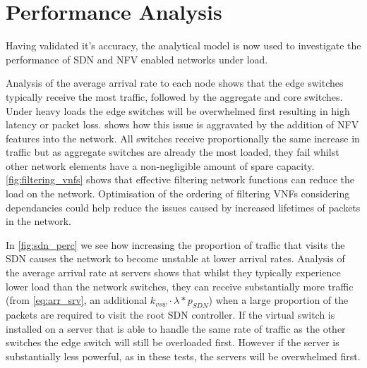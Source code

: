 \section{Performance Analysis}
Having validated it's accuracy, the analytical model is now used to investigate the performance of SDN and NFV enabled networks under load.

Analysis of the average arrival rate to each node shows that the edge switches typically receive the most traffic, followed by the aggregate and core switches. Under heavy loads the edge switches will be overwhelmed first resulting in high latency or packet loss.  shows how this issue is aggravated by the addition of NFV features into the network. All switches receive proportionally the same increase in traffic but as aggregate switches are already the most loaded, they fail whilst other network elements have a non-negligible amount of spare capacity. \ref{fig:filtering_vnfs} shows that effective filtering network functions can reduce the load on the network. Optimisation of the ordering of filtering VNFs considering dependancies could help reduce the issues caused by increased lifetimes of packets in the network.

In \ref{fig:sdn_perc} we see how increasing the proportion of traffic that visits the SDN causes the network to become unstable at lower arrival rates. Analysis of the average arrival rate at servers shows that whilst they typically experience lower load than the network switches, they can receive substantially more traffic (from \ref{eq:arr_srv}, an additional $k_{vsw} \cdot \lambda * p_{SDN}$) when a large proportion of the packets are required to visit the root SDN controller. If the virtual switch is installed on a server that is able to handle the same rate of traffic as the other switches the edge switch will still be overloaded first. However if the server is substantially less powerful, as in these tests, the servers will be overwhelmed first.